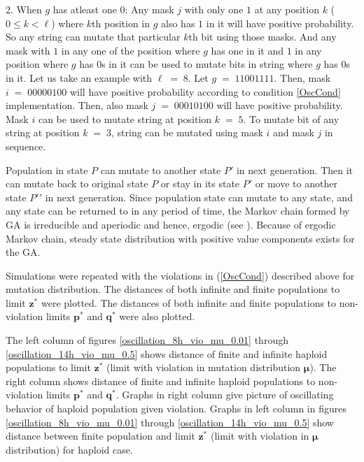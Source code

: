 2. When $g$ has atleast one $0$:\newline
Any mask $j$ with only one $1$ at any position $k$ ($0 \leq k < \ell$) where $k$th position in $g$ also has $1$ in it 
will have positive probability. So any string can mutate that particular $k$th bit using those masks. And any mask 
with $1$ in any one of the position where $g$ has one in it and $1$ in any position where $g$ has $0$s in it can be used to 
mutate bits in string where $g$ has $0$s in it. Let us take an example with $\ell \;=\; 8$. Let $g \;=\; 11001111$. Then, 
mask $i \;=\; 00000100$ will have positive probability according to condition \ref{OscCond} implementation. Then, also mask 
$j \;=\; 00010100$ will have positive probability. Mask $i$ can be used to mutate string at position $k \;=\; 5$. 
To mutate bit of any string at position $k \;=\; 3$, string can be mutated using mask $i$ and mask $j$ in sequence.

Population in state $P$ can mutate to another state $P\prime$ in next generation. Then it can mutate back to original state $P$ or 
stay in its state $P\prime$ or move to another state $P\prime\prime$ in next generation. Since population state can mutate to 
any state, and any state can be returned to in any period of time, the Markov chain formed by GA is irreducible and aperiodic and hence, 
ergodic (see \cite{MarkovChain}). Because of ergodic Markov chain, steady state distribution with positive value components exists for the GA.   

Simulations were repeated with the violations in (\ref{OscCond}) described above for mutation distribution.
The distances of both infinite and finite populations to limit $\bm{z}^\ast$ were plotted. 
The distances of both infinite and finite populations to non-violation limits $\bm{p}^\ast$ and $\bm{q}^\ast$ were also plotted.


The left column of figures \ref{oscillation_8h_vio_mu_0.01} through \ref{oscillation_14h_vio_mu_0.5} 
shows distance of finite and infinite haploid populations to limit $\bm{z^\ast}$ (limit with violation in mutation distribution $\bm{\mu}$). The 
right column shows distance of finite and infinite haploid populations to non-violation limits $\bm{p^\ast}$ and $\bm{q^\ast}$. 
Graphs in right column give picture of oscillating behavior of haploid population given violation. 
Graphs in left column in figures \ref{oscillation_8h_vio_mu_0.01} through \ref{oscillation_14h_vio_mu_0.5} show distance 
between finite population and limit $\bm{z}^\ast$ (limit with violation in $\bm{\mu}$ distribution) for haploid case.

